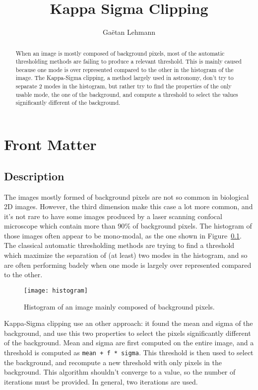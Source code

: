 \documentclass{InsightArticle}
\title{Kappa Sigma Clipping}
\author{Ga\"etan Lehmann}
\begin{document}
\maketitle

\ifhtml
\chapter*{Front Matter\label{front}}
\fi


\begin{abstract}
\noindent
When an image is mostly composed of background pixels, most of the automatic
thresholding methods are failing to produce a relevant threshold. This is mainly
caused because one mode is over represented compared to the other in the histogram
of the image. The Kappa-Sigma clipping, a method largely used in astronomy, don't
try to separate 2 modes in the histogram, but rather try to find the properties of
the only usable mode, the one of the background, and compute a threshold to select
the values significantly different of the background.
\end{abstract}


\section{Description}
The images mostly formed of background pixels are not so common in biological 2D images.
However, the third dimension make this case a lot more common, and it's not rare to
have some images produced by a laser scanning confocal microscope which contain more than 90\%
of background pixels. The histogram of those images often appear to be mono-modal, as
the one shown in Figure~\ref{histogram}. The classical automatic thresholding methods
are trying to find a threshold which maximize the separation of (at least) two modes in
the histogram, and so are often performing badely when one mode is largely over represented
compared to the other.

\begin{figure}[htbp]
\centering
\texttt{[image: histogram]}
\caption{Histogram of an image mainly composed of background pixels.\label{histogram}}
\end{figure}

Kappa-Sigma clipping use an other approach: it found the mean and sigma of the background, and
use this two properties to select the pixels significantly different of the background.
Mean and sigma are first computed on the entire image, and a threshold is computed as \verb$mean + f * sigma$.
This threshold is then used to select the background, and recompute a new threshold with only
pixels in the background.
This algorithm shouldn't converge to a value, so the number of iterations must be provided.
In general, two iterations are used.
\end{document}
